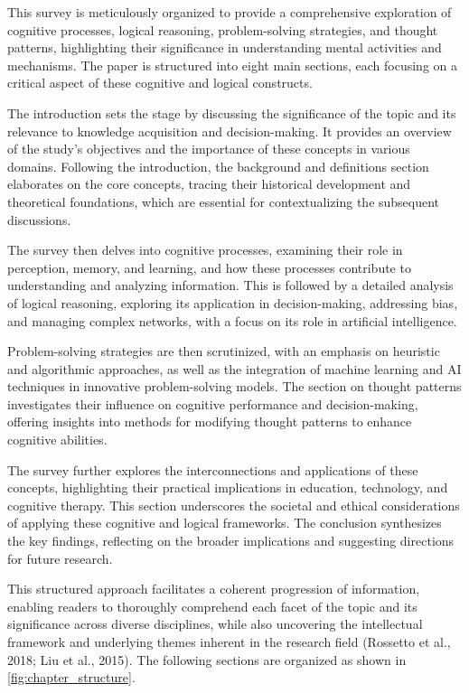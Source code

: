 This survey is meticulously organized to provide a comprehensive exploration of cognitive processes, logical reasoning, problem-solving strategies, and thought patterns, highlighting their significance in understanding mental activities and mechanisms. The paper is structured into eight main sections, each focusing on a critical aspect of these cognitive and logical constructs.



The introduction sets the stage by discussing the significance of the topic and its relevance to knowledge acquisition and decision-making. It provides an overview of the study's objectives and the importance of these concepts in various domains. Following the introduction, the background and definitions section elaborates on the core concepts, tracing their historical development and theoretical foundations, which are essential for contextualizing the subsequent discussions.



The survey then delves into cognitive processes, examining their role in perception, memory, and learning, and how these processes contribute to understanding and analyzing information. This is followed by a detailed analysis of logical reasoning, exploring its application in decision-making, addressing bias, and managing complex networks, with a focus on its role in artificial intelligence.



Problem-solving strategies are then scrutinized, with an emphasis on heuristic and algorithmic approaches, as well as the integration of machine learning and AI techniques in innovative problem-solving models. The section on thought patterns investigates their influence on cognitive performance and decision-making, offering insights into methods for modifying thought patterns to enhance cognitive abilities.



The survey further explores the interconnections and applications of these concepts, highlighting their practical implications in education, technology, and cognitive therapy. This section underscores the societal and ethical considerations of applying these cognitive and logical frameworks. The conclusion synthesizes the key findings, reflecting on the broader implications and suggesting directions for future research.



This structured approach facilitates a coherent progression of information, enabling readers to thoroughly comprehend each facet of the topic and its significance across diverse disciplines, while also uncovering the intellectual framework and underlying themes inherent in the research field (Rossetto et al., 2018; Liu et al., 2015). \cite{Contentsli1}The following sections are organized as shown in \autoref{fig:chapter_structure}.








